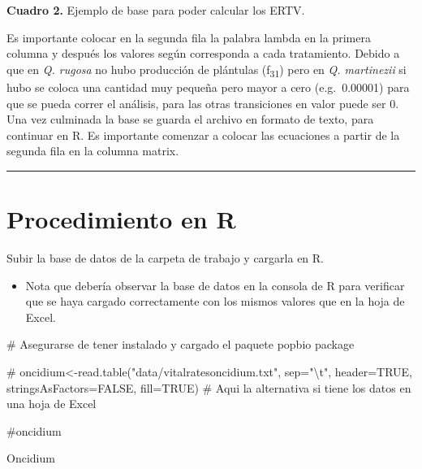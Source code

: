 \documentclass[
  12pt,
  letterpaper,
]{book}
\newenvironment{Shaded}{\begin{snugshade}}{\end{snugshade}}
\newcommand{\CommentTok}[1]{\textcolor[rgb]{0.37,0.37,0.37}{#1}}
\newcommand{\NormalTok}[1]{\textcolor[rgb]{0.00,0.23,0.31}{#1}}
\providecommand{\tightlist}{%
  \setlength{\itemsep}{0pt}\setlength{\parskip}{0pt}}\usepackage{longtable,booktabs,array}
\begin{document}
\textbf{Cuadro 2.} Ejemplo de base para poder calcular los ERTV.

Es importante colocar en la segunda fila la palabra lambda en la primera
columna y después los valores según corresponda a cada tratamiento.
Debido a que en \emph{Q. rugosa} no hubo producción de plántulas
(f\textsubscript{31}) pero en \emph{Q. martinezii} si hubo se coloca una
cantidad muy pequeña pero mayor a cero (e.g.~0.00001) para que se pueda
correr el análisis, para las otras transiciones en valor puede ser 0.
Una vez culminada la base se guarda el archivo en formato de texto, para
continuar en R. Es importante comenzar a colocar las ecuaciones a partir
de la segunda fila en la columna matrix.

\begin{center}\rule{0.5\linewidth}{0.5pt}\end{center}

\section{Procedimiento en R}\label{procedimiento-en-r}

Subir la base de datos de la carpeta de trabajo y cargarla en R.

\begin{itemize}
\tightlist
\item
  Nota que debería observar la base de datos en la consola de R para
  verificar que se haya cargado correctamente con los mismos valores que
  en la hoja de Excel.
\end{itemize}

\begin{Shaded}
\begin{Highlighting}[]
\CommentTok{\# Asegurarse de tener instalado y cargado el paquete \textquotesingle{}popbio\textquotesingle{} package }

\CommentTok{\# oncidium\textless{}{-}read.table("data/vitalratesoncidium.txt", sep="\textbackslash{}t", header=TRUE, stringsAsFactors=FALSE, fill=TRUE) }
     \CommentTok{\# Aqui la alternativa si tiene los datos en una hoja de Excel}

\CommentTok{\#oncidium }

\NormalTok{Oncidium}
\end{Highlighting}
\end{Shaded}
\end{document}
